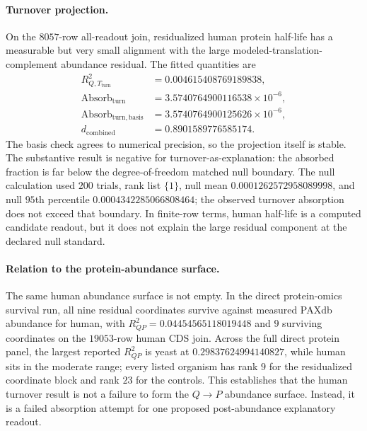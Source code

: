 \paragraph{Turnover projection.}
On the $8057$-row all-readout join, residualized human protein half-life has a measurable but very small alignment with the large modeled-translation-complement abundance residual.  The fitted quantities are
$$
\begin{aligned}
R^2_{Q,T_{\mathrm{turn}}} &= 0.004615408769189838,\\
\mathrm{Absorb}_{\mathrm{turn}} &= 3.5740764900116538\times 10^{-6},\\
\mathrm{Absorb}_{\mathrm{turn,basis}} &= 3.5740764900125626\times 10^{-6},\\
d_{\mathrm{combined}} &= 0.8901589776585174.
\end{aligned}
$$
The basis check agrees to numerical precision, so the projection itself is stable.  The substantive result is negative for turnover-as-explanation: the absorbed fraction is far below the degree-of-freedom matched null boundary.  The null calculation used $200$ trials, rank list $\{1\}$, null mean $0.0001262572958089998$, and null $95$th percentile $0.0004342285066808464$; the observed turnover absorption does not exceed that boundary.  In finite-row terms, human half-life is a computed candidate readout, but it does not explain the large residual component at the declared null standard.

\paragraph{Relation to the protein-abundance surface.}
The same human abundance surface is not empty.  In the direct protein-omics survival run, all nine residual coordinates survive against measured PAXdb abundance for human, with $R^2_{QP}=0.04454565118019448$ and $9$ surviving coordinates on the $19053$-row human CDS join.  Across the full direct protein panel, the largest reported $R^2_{QP}$ is yeast at $0.29837624994140827$, while human sits in the moderate range; every listed organism has rank $9$ for the residualized coordinate block and rank $23$ for the controls.  This establishes that the human turnover result is not a failure to form the $Q\to P$ abundance surface.  Instead, it is a failed absorption attempt for one proposed post-abundance explanatory readout.

